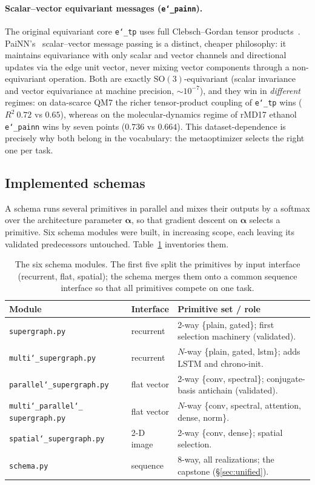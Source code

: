 \documentclass[11pt]{article}
\newcommand{\allowbreakhere}{\discretionary{}{}{}}
\newcommand{\code}[1]{\texttt{\def\_{\char`_\allowbreakhere}#1}}
\newcommand{\alphapar}{\bm{\alpha}}
\begin{document}
\paragraph{Scalar--vector equivariant messages (\code{e\_painn}).} The original equivariant core
\code{e\_tp} uses full Clebsch--Gordan tensor products~\cite{batzner2022nequip,batatia2022mace}. PaiNN's~\cite{schutt2021painn} scalar--vector message passing is a
distinct, cheaper philosophy: it maintains equivariance with only scalar and vector channels and
directional updates via the edge unit vector, never mixing vector components through a non-equivariant
operation. Both are exactly $\mathrm{SO}(3)$-equivariant (scalar invariance and vector equivariance at
machine precision, $\sim\!10^{-7}$), and they win in \emph{different} regimes: on data-scarce QM7 the
richer tensor-product coupling of \code{e\_tp} wins ($R^2\ 0.72$ vs $0.65$), whereas on the
molecular-dynamics regime of rMD17 ethanol \code{e\_painn} wins by seven points ($0.736$ vs $0.664$).
This dataset-dependence is precisely why both belong in the vocabulary: the metaoptimizer selects the
right one per task.

\subsection{Implemented schemas}
\label{sec:schemas}

A schema runs several primitives in parallel and mixes their outputs by a softmax over the
architecture parameter $\alphapar$, so that gradient descent on $\alphapar$ selects a
primitive. Six schema modules were built, in increasing scope, each leaving its validated
predecessors untouched. Table~\ref{tab:schemas} inventories them.

\begin{table}[h]
\centering
\small
\renewcommand{\arraystretch}{1.2}
\begin{tabular}{p{4.0cm} p{1.9cm} p{6.6cm}}
\toprule
\textbf{Module} & \textbf{Interface} & \textbf{Primitive set / role}\\
\midrule
\code{supergraph.py} & recurrent & 2-way \{plain, gated\}; first selection machinery (validated).\\
\code{multi\_supergraph.py} & recurrent & $N$-way \{plain, gated, lstm\}; adds LSTM and chrono-init.\\
\code{parallel\_supergraph.py} & flat vector & 2-way \{conv, spectral\}; conjugate-basis antichain (validated).\\
\code{multi\_parallel\_} \code{supergraph.py} & flat vector & $N$-way \{conv, spectral, attention, dense, norm\}.\\
\code{spatial\_supergraph.py} & 2-D image & 2-way \{conv, dense\}; spatial selection.\\
\code{schema.py} & sequence & 8-way, all realizations; the capstone (\S\ref{sec:unified}).\\
\bottomrule
\end{tabular}
\caption{The six schema modules. The first five split the primitives by input interface
(recurrent, flat, spatial); the schema merges them onto a common sequence
interface so that all primitives compete on one task.}
\label{tab:schemas}
\end{table}
\end{document}

